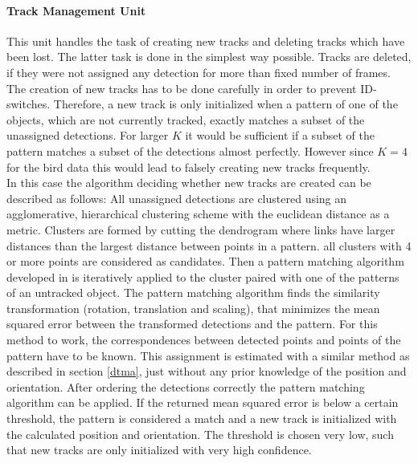 \documentclass[12pt,a4paper]{article}
\begin{document}
\paragraph{Track Management Unit} This unit handles the task of creating new tracks and deleting tracks which have been lost. The latter task is done in the simplest way possible. Tracks are deleted, if they were not assigned any detection for more than fixed number of frames.\\ 
The creation of new tracks has to be done carefully in order to prevent ID-switches. Therefore, a new track is only initialized when a pattern of one of the objects, which are not currently tracked, exactly matches a subset of the unassigned detections. For larger $K$ it would be sufficient if a subset of the pattern matches a subset of the detections almost perfectly. However since $K=4$ for the bird data this would lead to falsely creating new tracks frequently.\\
In this case the algorithm deciding whether new tracks are created can be described as follows: All unassigned detections are clustered using an agglomerative, hierarchical clustering scheme with the euclidean distance as a metric. Clusters are formed by cutting the dendrogram where links have larger distances than the largest distance between points in a pattern. all clusters with 4 or more points are considered as candidates. Then a pattern matching algorithm developed in \cite{umeyama} is iteratively applied to the cluster paired with one of the patterns of an untracked object. The pattern matching algorithm finds the similarity transformation (rotation, translation and scaling), that minimizes the mean squared error between the transformed detections and the pattern. For this method to work, the correspondences between detected points and points of the pattern have to be known. This assignment is estimated with a similar method as described in section \ref{dtma}, just without any prior knowledge of the position and orientation. After ordering the detections correctly the pattern matching algorithm can be applied. If the returned mean squared error is below a certain threshold, the pattern is considered a match and a new track is initialized with the calculated position and orientation. The threshold is chosen very low, such that new tracks are only initialized with very high confidence.

 
\end{document}
